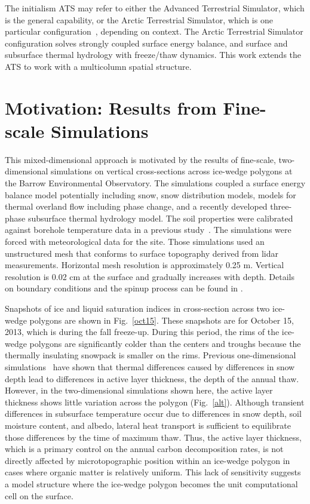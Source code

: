 \documentclass[review]{elsarticle}
\begin{document}
 The initialism ATS may refer to either the Advanced Terrestrial Simulator, which is the general capability, or the Arctic Terrestrial Simulator, which is one particular configuration~\cite{spainter2016integrated}, depending on context. The Arctic Terrestrial Simulator configuration solves strongly coupled surface energy balance, and surface and subsurface thermal hydrology with freeze/thaw dynamics. This work extends the ATS to work with a multicolumn spatial structure. 


\section{Motivation: Results from Fine-scale Simulations}\label{motivation}

This mixed-dimensional approach is motivated by the results of fine-scale, two-dimensional simulations on vertical cross-sections across ice-wedge polygons at the Barrow Environmental Observatory. The simulations coupled a surface energy balance model potentially including snow, snow distribution models, models for thermal overland flow including phase change, and a recently developed three-phase subsurface thermal hydrology model. The soil properties were calibrated against borehole temperature data in a previous study~\cite{atchley2015}. The simulations were forced with meteorological data for the site. Those simulations used an unstructured mesh that conforms to surface topography derived from lidar measurements. Horizontal mesh resolution is approximately 0.25 m. Vertical resolution is 0.02 cm at the surface and gradually increases with depth. Details on boundary conditions and the spinup process can be found in \cite{spainter2016integrated}. 

Snapshots of ice and liquid saturation indices in cross-section across two ice-wedge polygons are shown in Fig.~\ref{oct15}. These snapshots are for October 15, 2013, which is during the fall freeze-up. During this period, the rims of the ice-wedge polygons are significantly colder than the centers and troughs because the thermally insulating snowpack is smaller on the rims. Previous one-dimensional simulations~\cite{atchley2016} have shown that thermal differences caused by differences in snow depth lead to differences in active layer thickness, the depth of the annual thaw. However, in the two-dimensional simulations shown here, the active layer thickness shows little variation across the polygon (Fig.~\ref{alt}). Although transient differences in subsurface temperature occur due to differences in snow depth, soil moisture content, and albedo, lateral heat transport is sufficient to equilibrate those differences by the time of maximum thaw. Thus, the active layer thickness, which is a primary control on the annual carbon decomposition rates, is not directly affected by microtopographic position within an ice-wedge polygon in cases where organic matter is relatively uniform. This lack of sensitivity suggests a model structure where the ice-wedge polygon becomes the unit computational cell on the surface. 
\end{document}
